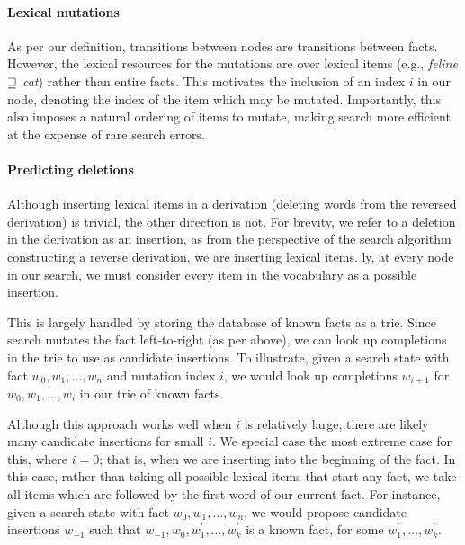 \paragraph{Lexical mutations}
As per our definition, transitions between nodes are transitions 
  between facts.
However, the lexical resources for the mutations are over lexical items
  (e.g., \textit{feline} $\sqsupseteq$ \textit{cat}) rather than
  entire facts.
This motivates the inclusion of an index $i$ in our node, denoting the
  index of the item which may be mutated.
Importantly, this also imposes a natural ordering of items to
  mutate, making search more efficient at the expense of rare
  search errors.


\paragraph{Predicting deletions}
Although inserting lexical items in a derivation (deleting words from
  the reversed derivation) is trivial, the other direction is not.
For brevity, we refer to a deletion in the derivation as an insertion,
  as from the perspective of the search algorithm constructing a reverse
  derivation, we are inserting lexical items.
\naive ly, at every node in our search, we must consider every item in
  the vocabulary as a possible insertion.

This is largely handled by storing the database of known facts as a
  trie.
Since search mutates the fact left-to-right (as per above), we can
  look up completions in the trie to use as candidate insertions.
To illustrate, given a search state with fact $w_0,w_1,\dots,w_n$
  and mutation index $i$, we would look up completions $w_{i+1}$ for
  $w_0,w_1,\dots,w_i$ in our trie of known facts.

Although this approach works well when $i$ is relatively large, there
  are likely many candidate insertions for small $i$.
We special case the most extreme case for this, where $i=0$; that is, 
  when we are inserting into the beginning of the fact.
In this case, rather than taking all possible lexical items that start
  any fact, we take all items which are followed by the first word of
  our current fact.
For instance, given a search state with fact $w_0,w_1,\dots,w_n$,
  we would propose candidate insertions $w_{-1}$ such that
  $w_{-1},w_0,w^\prime_1,\dots,w^\prime_k$ is a known fact,
  for some $w^\prime_1,\dots,w^\prime_k$.
  
